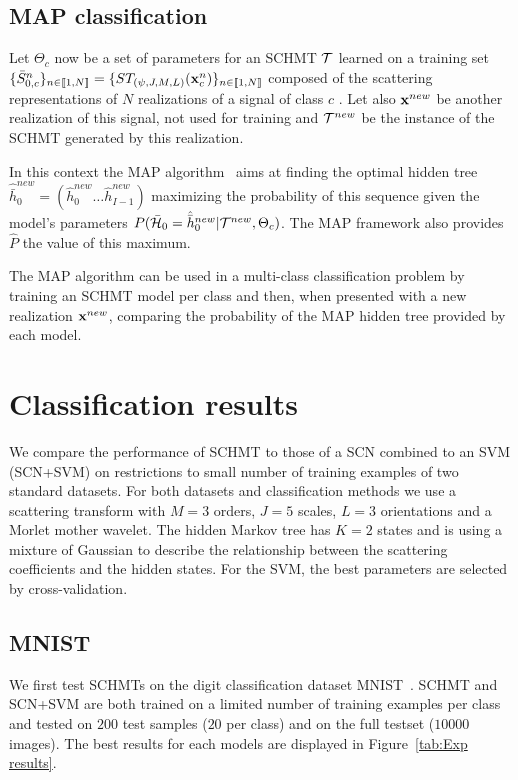 \documentclass{article}
\begin{document}
  \vspace{-5pt}
	\subsection{MAP classification}
    \label{subsec:SCN/MAP}
    \vspace{-5pt}
    Let $\Theta_{c}$ now be a set of parameters for an SCHMT $\mathcal{T}$ learned on a training set $\{\bar{S}_{0,c}^n\}_{n \in \llbracket1, N \rrbracket} = \{ST_{(\psi, J, M, L)}({\bf x}_{c}^{n})\}_{n \in \llbracket1, N \rrbracket}$ composed of the scattering representations of $N$ realizations of a signal of class $c$ . Let also ${\bf x}^{new}$ be another realization of this signal, not used for training and $\mathcal{T}^{new}$ be the instance of the SCHMT generated by this realization.
     
    In this context the MAP algorithm~\cite{durand2001statistical} aims at finding the optimal hidden tree $\hat{\bar{h}}_{0}^{new}=(\hat{h}_{0}^{new} \dots \hat{h}_{I-1}^{new})$ maximizing the probability of this sequence given the model's parameters $P(\bar{\mathcal{H}}_{0}= \hat{\bar{h}}_{0}^{new}|\mathcal{T}^{new},\Theta_{c})$. The MAP framework also provides $\hat{P}$ the value of this maximum.
    
    The MAP algorithm can be used in a multi-class classification problem by training an SCHMT model per class and then, when presented with a new realization ${\bf x}^{new}$, comparing the probability of the MAP hidden tree provided by each model.
    
\section{Classification results}
  \label{sec:Exps}
  \vspace{-5pt}
  We compare the performance of SCHMT to those of a SCN combined to an SVM (SCN+SVM) on restrictions to small number of training examples of two standard datasets. For both datasets and classification methods we use a scattering transform with $M=3$ orders, $J=5$ scales, $L=3$ orientations and a Morlet mother wavelet. The hidden Markov tree has $K=2$ states and is using a mixture of Gaussian to describe the relationship between the scattering coefficients and the hidden states. For the SVM, the best parameters are selected by cross-validation.
  
  \vspace{-5pt}
  \subsection{MNIST}
		\label{subsec:Exps/MNIST}
		\vspace{-5pt}
		We first test SCHMTs on the digit classification dataset MNIST~\cite{lecun2016web}. SCHMT and SCN+SVM are both trained on a limited number of training examples per class and tested on $200$ test samples ($20$ per class) and on the full testset ($10000$ images). The best results for each models are displayed in Figure~\ref{tab:Exp results}.
\end{document}
